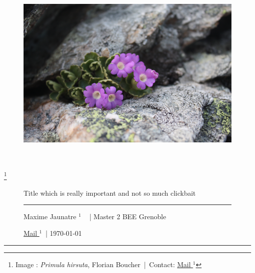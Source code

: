 \documentclass[12pt,a4paper,notitlepage,colorinlistoftodos]{article}
\begin{document}
{{\begin{titlepage}
\begin{figure}[h]
\begin{center}
\includegraphics[height = 9.5cm]{fig/Primula_hirsuta_Grand_Chat_longistyle.JPG}
\end{center}
\end{figure}
\thispagestyle{empty}

{\let\thefootnote\relax\footnote{{\noindent Image : \textit{Primula hirsuta}, Florian Boucher~|~Contact:  \href{mailto:maxime.jaunatre@etu.univ-grenoble-alpes.fr}{Mail $^1$}} 
}}
\end{titlepage}

}{
\begin{figure}
   \centering
    \begin{minipage}{.75\textwidth}
    \begin{center}
    {\Large Title which is really important and not so much clickbait}
    \end{center}
    \rule{7em}{.4pt}\par
     Maxime Jaunatre $^1$ ~ | Master 2 BEE Grenoble \par 
	\href{mailto:maxime.jaunatre@etu.univ-grenoble-alpes.fr}{Mail $^1$}~| \today \par 
\end{minipage}
\end{figure}

\hrule
}
}
\end{document}
